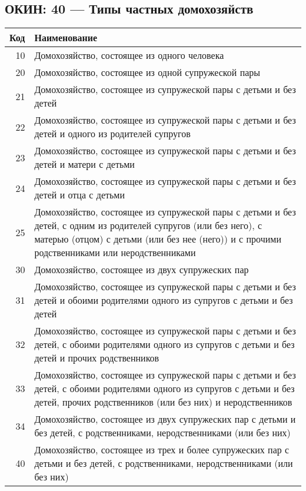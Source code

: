 \documentclass[10pt, a4paper, titlepage]{article}
\begin{document}
\subsection{ОКИН: 40 --- Типы частных домохозяйств}

\begin{center}
    \begin{longtable}{rp{}}
        \hline
        \textbf{Код} & \textbf{Наименование} \\ \hline
        10 & Домохозяйство, состоящее из одного человека \\
        20 & Домохозяйство, состоящее из одной супружеской пары \\
        21 & Домохозяйство, состоящее из супружеской пары с детьми и без детей \\
        22 & Домохозяйство, состоящее из супружеской пары с детьми и без детей и одного из родителей супругов \\
        23 & Домохозяйство, состоящее из супружеской пары с детьми и без детей и матери с детьми \\
        24 & Домохозяйство, состоящее из супружеской пары с детьми и без детей и отца с детьми \\
        25 & Домохозяйство, состоящее из супружеской пары с детьми и без детей, с одним из родителей супругов (или без него), с матерью (отцом) с детьми (или без нее (него)) и с прочими родственниками или неродственниками \\
        30 & Домохозяйство, состоящее из двух супружеских пар \\
        31 & Домохозяйство, состоящее из супружеской пары с детьми и без детей и обоими родителями одного из супругов с детьми и без детей \\
        32 & Домохозяйство, состоящее из супружеской пары с детьми и без детей, с обоими родителями одного из супругов с детьми и без детей и прочих родственников \\
        33 & Домохозяйство, состоящее из супружеской пары с детьми и без детей, с обоими родителями одного из супругов с детьми и без детей, прочих родственников (или без них) и неродственников \\
        34 & Домохозяйство, состоящее из двух супружеских пар с детьми и без детей, с родственниками, неродственниками (или без них) \\
        40 & Домохозяйство, состоящее из трех и более супружеских пар с детьми и без детей, с родственниками, неродственниками (или без них) \\

\end{longtable}
\end{center}
\end{document}
